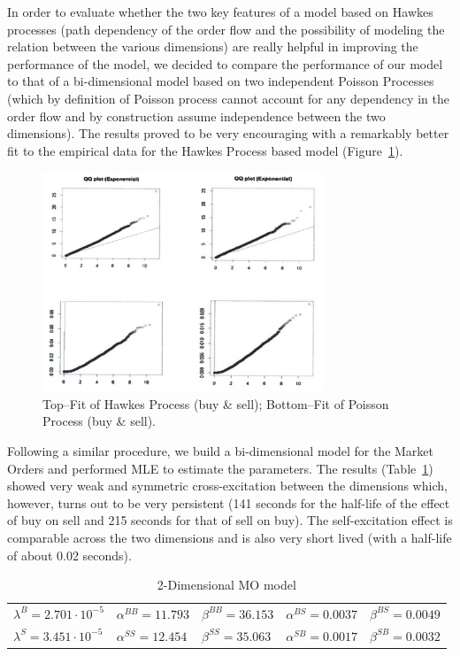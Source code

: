 In order to evaluate whether the two key features of a model based on Hawkes processes (path dependency of the order flow and the possibility of modeling the relation between the various dimensions) are really helpful in improving the performance of the model, we decided to compare the performance of our model to that of a bi-dimensional model based on two independent Poisson Processes (which by definition of Poisson process cannot account for any dependency in the order flow and by construction assume independence between the two dimensions). The results proved to be very encouraging with a remarkably better fit to the empirical data for the Hawkes Process based model (Figure~\ref{fig:4hawkes6}).
	\begin{figure}[!ht]
   	\centering
   	\includegraphics[width=0.75\textwidth]{chapters/chapter_el_exch/figures/4hawkes6.png} 
   	\caption{Top--Fit of Hawkes Process (buy \& sell); Bottom--Fit of Poisson Process (buy \& sell). \label{fig:4hawkes6}}
	\end{figure}


Following a similar procedure, we build a bi-dimensional model for the Market Orders and performed MLE to estimate the parameters. The results (Table~\ref{tab:2dimmomod}) showed very weak and symmetric cross-excitation between the dimensions which, however, turns out to be very persistent (141 seconds for the half-life of the effect of buy on sell and 215 seconds for that of sell on buy). The self-excitation effect is comparable across the two dimensions and is also very short lived (with a half-life of about 0.02 seconds).
	\begin{table}
	\centering
	\caption{2-Dimensional MO model \label{tab:2dimmomod}}
	\begin{tabular}{lllll}  
	$\lambda^B=2.701 \cdot 10^{-5}$ & $\alpha^{BB}=11.793$ & $\beta^{BB}=36.153$ & $\alpha^{BS}=0.0037$ & $\beta^{BS}=0.0049$ \\
	$\lambda^S=3.451 \cdot 10^{-5}$ & $\alpha^{SS}=12.454$ & $\beta^{SS}=35.063$ & $\alpha^{SB}=0.0017$ & $\beta^{SB}=0.0032$
	\end{tabular}
	\end{table}
	

